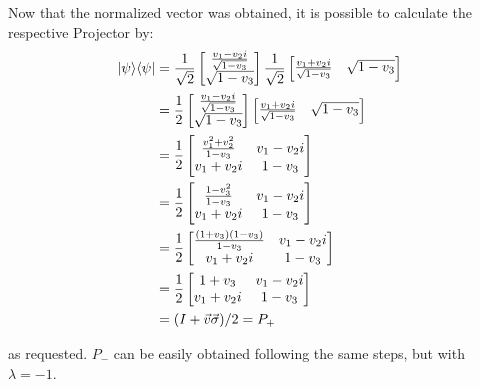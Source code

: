 Now that the normalized vector was obtained,
it is possible to calculate the respective Projector by:
\begin{align}
    \mathop{\mathinner{ |{\psi}\rangle \langle{\psi}|}} &= \frac{1}{\sqrt2}
        \left[ \begin{matrix}
            \frac{v_1 - v_2i}{\sqrt{1 - v_3}} \\
            \sqrt{1 - v_3}
        \end{matrix} \right]
        \frac{1}{\sqrt2}
        \left[ \begin{matrix}
            \frac{v_1 + v_2i}{\sqrt{1 - v_3}} &
            \sqrt{1 - v_3}
        \end{matrix} \right] \\
    &= \frac{1}{2} \left[ \begin{matrix}
            \frac{v_1 - v_2i}{\sqrt{1 - v_3}} \\
            \sqrt{1 - v_3}
        \end{matrix} \right]
        \left[ \begin{matrix}
            \frac{v_1 + v_2i}{\sqrt{1 - v_3}} &
            \sqrt{1 - v_3}
        \end{matrix} \right] \\
    &= \frac{1}{2} \left[ \begin{matrix}
        \frac{v_1^2 + v_2^2}{1 - v_3} & v_1 - v_2i \\
        v_1 + v_2i & 1 - v_3
        \end{matrix} \right] \\
    &= \frac{1}{2} \left[ \begin{matrix}
        \frac{1 - v_3^2}{1 - v_3} & v_1 - v_2i \\
        v_1 + v_2i & 1 - v_3
        \end{matrix} \right] \\
    &= \frac{1}{2} \left[ \begin{matrix}
        \frac{(1 + v_3)(1 - v_3)}{1 - v_3} & v_1 - v_2i \\
        v_1 + v_2i & 1 - v_3
        \end{matrix} \right] \\
    &= \frac{1}{2} \left[ \begin{matrix}
        1 + v_3 & v_1 - v_2i \\
        v_1 + v_2i & 1 - v_3
        \end{matrix} \right] \\
    &= (I + \vec{v} \vec{\sigma}) / 2 = P_+
\end{align}

as requested.
$P_-$ can be easily obtained following the same steps,
but with $\lambda = -1$.